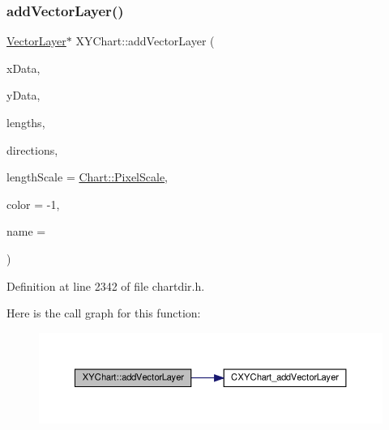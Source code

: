 \subsubsection{\texorpdfstring{add\+Vector\+Layer()}{addVectorLayer()}}
{\footnotesize\ttfamily \hyperlink{class_vector_layer}{Vector\+Layer}$\ast$ X\+Y\+Chart\+::add\+Vector\+Layer (\begin{DoxyParamCaption}\item[{\hyperlink{class_double_array}{Double\+Array}}]{x\+Data,  }\item[{\hyperlink{class_double_array}{Double\+Array}}]{y\+Data,  }\item[{\hyperlink{class_double_array}{Double\+Array}}]{lengths,  }\item[{\hyperlink{class_double_array}{Double\+Array}}]{directions,  }\item[{int}]{length\+Scale = {\ttfamily \hyperlink{namespace_chart_af8005281e1fb57d737e9f89b13605808afebebf69a28e58958dc5f9da3ece2147}{Chart\+::\+Pixel\+Scale}},  }\item[{int}]{color = {\ttfamily -\/1},  }\item[{const char $\ast$}]{name = {} }\end{DoxyParamCaption})\hspace{0.3cm}{\ttfamily [inline]}}



Definition at line 2342 of file chartdir.\+h.

Here is the call graph for this function\+:
\nopagebreak
\begin{figure}[H]
\begin{center}
\leavevmode
\includegraphics[width=350pt]{class_x_y_chart_aa353997d175e029e1e1269729a7d987a_cgraph}
\end{center}
\end{figure}
\mbox{\label{class_x_y_chart_a04ee62276a0fbe1575caf96147b4e773}} 
